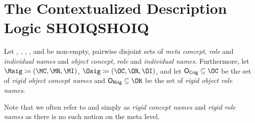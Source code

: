 \chapter{The Contextualized Description Logic SHOIQSHOIQ}



\label{cha:context-dls}

\begin{definition}
  Let \MC, \MR, \MI, \OC, \OR and \OI be non-empty, pairwise disjoint sets of \emph{meta concept}, \emph{role} and
  \emph{individual names} and\emph{ object concept}, \emph{role} and \emph{individual
    names}. Furthermore, let $\Msig \coloneqq (\MC,\MR,\MI)$,  $\Osig \coloneqq (\OC,\OR,\OI)$, and
  let $\OCR\subseteq\OC$ be the set of \emph{rigid object concept names} and $\ORR\subseteq\OR$ be the set of \emph{rigid object role names}.
\end{definition}

Note that we often refer to \OCR and \ORR simply as \emph{rigid concept names} and \emph{rigid role
  names} as there is no such notion on the meta level.




